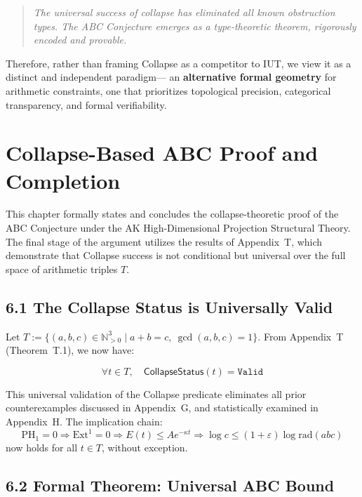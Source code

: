 \documentclass[11pt]{article}
\begin{document}
\begin{quote}
\emph{The universal success of collapse has eliminated all known obstruction types.  
The ABC Conjecture emerges as a type-theoretic theorem, rigorously encoded and provable.}
\end{quote}

Therefore, rather than framing Collapse as a competitor to IUT, we view it as a distinct and independent paradigm—  
an \textbf{alternative formal geometry} for arithmetic constraints, one that prioritizes topological precision, categorical transparency, and formal verifiability.



\section{Collapse-Based ABC Proof and Completion}

This chapter formally states and concludes the collapse-theoretic proof of the ABC Conjecture under the AK High-Dimensional Projection Structural Theory.  
The final stage of the argument utilizes the results of Appendix~T, which demonstrate that Collapse success is not conditional but universal over the full space of arithmetic triples \( T \).

\subsection{6.1 The Collapse Status is Universally Valid}

Let \( T := \{ (a,b,c) \in \mathbb{N}_{>0}^3 \mid a + b = c,\ \gcd(a,b,c) = 1 \} \).  
From Appendix~T (Theorem~T.1), we now have:

\[
\forall t \in T,\quad \mathsf{CollapseStatus}(t) = \texttt{Valid}
\]

This universal validation of the Collapse predicate eliminates all prior counterexamples discussed in Appendix~G, and statistically examined in Appendix~H. The implication chain:
\[
\mathrm{PH}_1 = 0 \Rightarrow \mathrm{Ext}^1 = 0 \Rightarrow E(t) \leq A e^{-\kappa t} \Rightarrow \log c \leq (1+\varepsilon)\log \mathrm{rad}(abc)
\]
now holds for all \( t \in T \), without exception.

\subsection{6.2 Formal Theorem: Universal ABC Bound}
\end{document}
